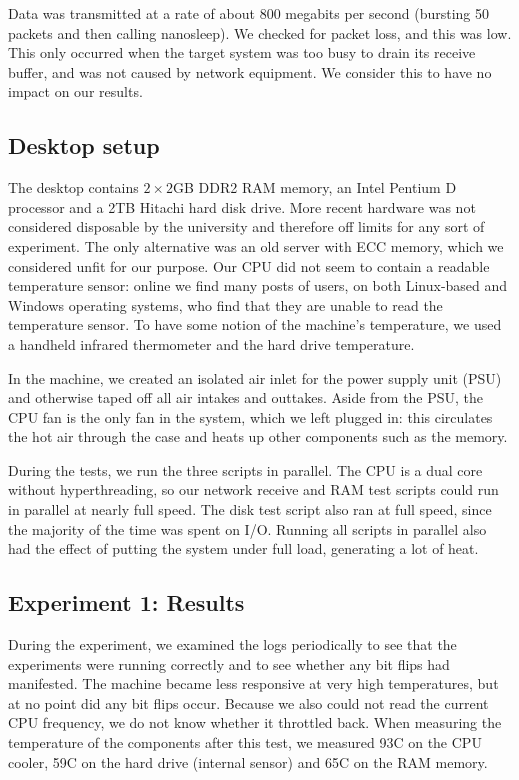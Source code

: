 \documentclass[conference]{IEEEtran}
\begin{document}
Data was transmitted at a rate of about 800 megabits per second (bursting 50
packets and then calling nanosleep). We checked for packet loss, and this was
low. This only occurred when the target system was too busy to drain its
receive buffer, and was not caused by network equipment. We consider this to
have no impact on our results.


\subsection{Desktop setup}

The desktop contains $2\times2$GB DDR2 RAM memory, an Intel Pentium D processor
and a 2TB Hitachi hard disk drive. More recent hardware was not considered
disposable by the university and therefore off limits for any sort of
experiment. The only alternative was an old server with ECC memory, which we
considered unfit for our purpose. Our CPU did not seem to contain a readable
temperature sensor: online we find many posts of users, on both Linux-based and
Windows operating systems, who find that they are unable to read the
temperature sensor. To have some notion of the machine's temperature, we used a
handheld infrared thermometer and the hard drive temperature.

In the machine, we created an isolated air inlet for the power supply unit
(PSU) and otherwise taped off all air intakes and outtakes. Aside from the PSU,
the CPU fan is the only fan in the system, which we left plugged in: this
circulates the hot air through the case and heats up other components such as
the memory.

During the tests, we run the three scripts in parallel. The CPU is a dual core
without hyperthreading, so our network receive and RAM test scripts could run
in parallel at nearly full speed. The disk test script also ran at full speed,
since the majority of the time was spent on I/O. Running all scripts in
parallel also had the effect of putting the system under full load, generating
a lot of heat.

\subsection{Experiment 1: Results}

During the experiment, we examined the logs periodically to see that the
experiments were running correctly and to see whether any bit flips had
manifested. The machine became less responsive at very high temperatures, but
at no point did any bit flips occur. Because we also could not read the current
CPU frequency, we do not know whether it throttled back. When measuring the
temperature of the components after this test, we measured 93\degree{}C on the
CPU cooler, 59\degree{}C on the hard drive (internal sensor) and 65\degree{}C
on the RAM memory.
\end{document}
